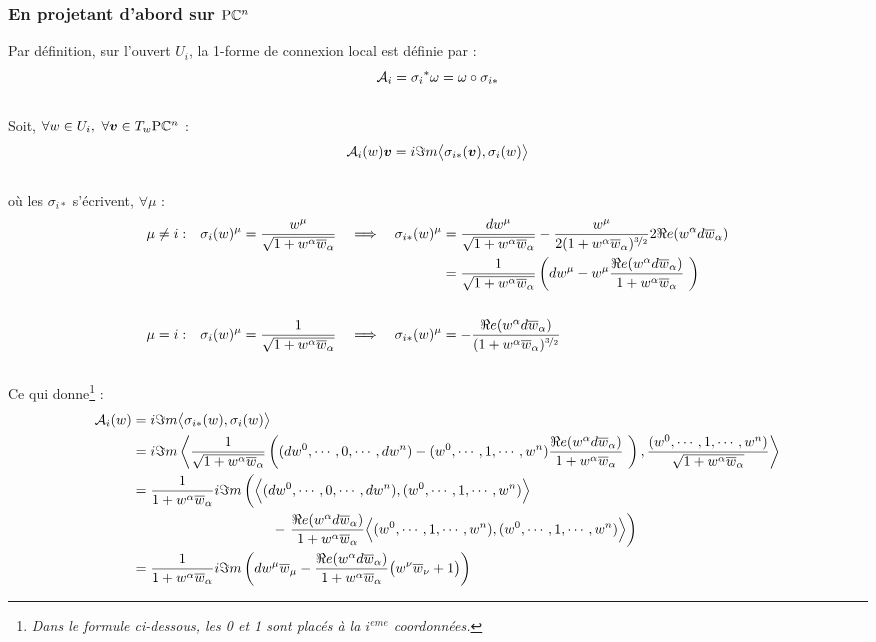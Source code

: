 \subsubsection{\wip En projetant d'abord sur $\PC{n}$}

Par définition, sur l'ouvert $U_i$, la 1-forme de connexion local est définie par :
\[\locconn_i = {\sigma_i}^*\conn = \conn\circ \sigma_{i*}\]
\\
Soit, $\forall w\in U_i,\ \forall \bf{v}\in\tg[w]{\PC{n}}$ :
\[\locconn_i(w)\bf{v}= i\Im m \big\langle \sigma_{i*}(\bf{v}), \sigma_i(w) \big\rangle\]
\\
où les $\sigma_{i*}$ s'écrivent, $\forall \mu$ :
\begin{align*}
	\mu &\neq i : &  \sigma_i(w)^\mu = \frac{w^\mu}{\sqrt{1 + w^\alpha\congu{w}_\alpha}}\quad \Lr\quad
	\sigma_{i*}(w)^\mu &= \frac{dw^\mu}{\sqrt{1 + w^\alpha\congu{w}_\alpha}} - \frac{w^\mu}{2(1 + w^\alpha\congu{w}_\alpha)^{\nicefrac{3}{2}}}2\Re e(w^\alpha d\congu{w}_\alpha) \\
	&  &  &= \frac{1}{\sqrt{1 + w^\alpha\congu{w}_\alpha}}\left(dw^\mu - w^\mu \frac{\Re e(w^\alpha d\congu{w}_\alpha)}{1 + w^\alpha\congu{w}_\alpha}\ \right)
	\\ \\
	\mu &= i :  &  \sigma_i(w)^\mu = \frac{1}{\sqrt{1 + w^\alpha\congu{w}_\alpha}}\quad \Lr\quad
	\sigma_{i*}(w)^\mu &= - \frac{\Re e(w^\alpha d\congu{w}_\alpha)}{(1 + w^\alpha\congu{w}_\alpha)^{\nicefrac{3}{2}}}
\end{align*}
\\
Ce qui donne\footnote{\itshape
	Dans le formule ci-dessous, les 0 et 1 sont placés à la $i^{eme}$ coordonnées.
} :
\begin{align*}
	\locconn_i(w) &= i\Im m \big\langle \sigma_{i*}(w), \sigma_i(w) \big\rangle \\
	&= i\Im m \left\langle \frac{1}{\sqrt{1 + w^\alpha\congu{w}_\alpha}}\left((dw^0,\cdots , 0, \cdots, dw^n) - (w^0,\cdots , 1, \cdots, w^n) \frac{\Re e(w^\alpha d\congu{w}_\alpha)}{1 + w^\alpha\congu{w}_\alpha}\ \right), \frac{(w^0,\cdots , 1, \cdots, w^n)}{\sqrt{1 + w^\alpha\congu{w}_\alpha}} \right\rangle \\
	&= \frac{1}{1 + w^\alpha\congu{w}_\alpha} i\Im m \left( \Big\langle (dw^0,\cdots , 0, \cdots, dw^n), (w^0,\cdots , 1, \cdots, w^n) \Big\rangle \bigg. \right. \\
	&\qquad\qquad\qquad\qquad\qquad - \left.  \frac{\Re e(w^\alpha d\congu{w}_\alpha)}{1 + w^\alpha\congu{w}_\alpha}\Big\langle (w^0,\cdots , 1, \cdots, w^n) , (w^0,\cdots , 1, \cdots, w^n) \Big\rangle \right) \\
	&= \frac{1}{1 + w^\alpha\congu{w}_\alpha} i\Im m \left( dw^\mu\congu{w}_\mu -  \frac{\Re e(w^\alpha d\congu{w}_\alpha)}{1 + w^\alpha\congu{w}_\alpha}\big( w^\nu\congu{w}_\nu +1 \big) \right)
\end{align*}
